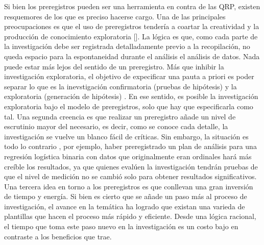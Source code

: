 \documentclass[
]{book}
\begin{document}
Si bien los preregistros pueden ser una herramienta en contra de las QRP, existen resquemores de los que es preciso hacerse cargo. Una de las principales preocupaciones es que el uso de preregistros tendería a coartar la creatividad y la producción de conocimiento exploratoria {[}{]}. La lógica es que, como cada parte de la investigación debe ser registrada detalladamente previo a la recopilación, no queda espacio para la espontaneidad durante el análisis el análisis de datos. Nada puede estar más lejos del sentido de un preregistro. Más que inhibir la investigación exploratoria, el objetivo de expecificar una pauta a priori es poder separar lo que es la inevstigación confirmatoria (pruebas de hipótesis) y la exploratoria (generación de hipótesis) \citep{nosek_preregistration_2018}. En ese sentido, es posible la investigación exploratoria bajo el modelo de preregistros, solo que hay que especificarla como tal. Una segunda creencia es que realizar un preregistro añade un nivel de escrutinio mayor del necesario, es decir, como se conoce cada detalle, la investigación se vuelve un blanco fácil de críticas. Sin embargo, la situación es todo lo contrario \citep{moore_Preregister_2016}, por ejemplo, haber preregistrado un plan de análisis para una regresión logística binaria con datos que originalmente eran ordinales hará más creíble los resultados, ya que quienes evalúen la investigación tendrán pruebas de que el nivel de medición no se cambió solo para obtener resultados significativos. Una tercera idea en torno a los preregistros es que conllevan una gran inversión de tiempo y energía. Si bien es cierto que se añade un paso más al proceso de investigación, el avance en la temática ha logrado que existan una varieda de plantillas que hacen el proceso más rápido y eficiente. Desde una lógica racional, el tiempo que toma este paso nuevo en la investigación es un costo bajo en contraste a los beneficios que trae.
\end{document}
